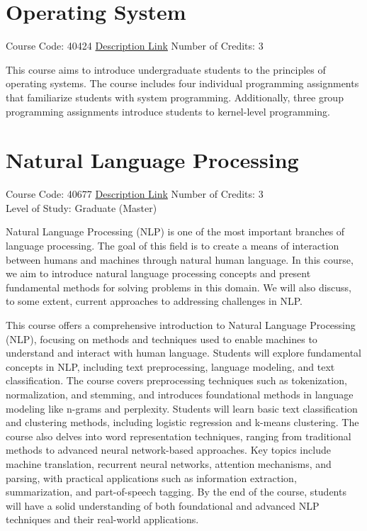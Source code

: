 \section{Operating System}
Course Code: 40424 \qquad \quad \href{https://docs.ce.sharif.edu/course/40424}{Description Link}
\qquad \quad Number of Credits: 3

This course aims to introduce undergraduate students to the principles of operating systems. The course includes four individual programming assignments that familiarize students with system programming. Additionally, three group programming assignments introduce students to kernel-level programming.

\section{Natural Language Processing}
Course Code: 40677 \qquad \quad \href{https://docs.ce.sharif.edu/course/40677}{Description Link}
\qquad \quad Number of Credits: 3 
\\Level of Study: Graduate (Master)

Natural Language Processing (NLP) is one of the most important branches of language processing. The goal of this field is to create a means of interaction between humans and machines through natural human language. In this course, we aim to introduce natural language processing concepts and present fundamental methods for solving problems in this domain. We will also discuss, to some extent, current approaches to addressing challenges in NLP.

This course offers a comprehensive introduction to Natural Language Processing (NLP), focusing on methods and techniques used to enable machines to understand and interact with human language. Students will explore fundamental concepts in NLP, including text preprocessing, language modeling, and text classification. The course covers preprocessing techniques such as tokenization, normalization, and stemming, and introduces foundational methods in language modeling like n-grams and perplexity. Students will learn basic text classification and clustering methods, including logistic regression and k-means clustering. The course also delves into word representation techniques, ranging from traditional methods to advanced neural network-based approaches. Key topics include machine translation, recurrent neural networks, attention mechanisms, and parsing, with practical applications such as information extraction, summarization, and part-of-speech tagging. By the end of the course, students will have a solid understanding of both foundational and advanced NLP techniques and their real-world applications.

